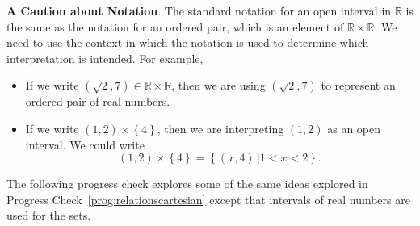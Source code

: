 \noindent
\note \textbf{A Caution about Notation}.  The standard notation for an open interval in  $\mathbb{R}$ is the same as the notation for an ordered pair, which is an element of  \mbox{$\mathbb{R} \times \mathbb{R}$}.  We need to use the context in which the notation is used to determine which interpretation is intended.  For example,

\begin{itemize}
\item If we write  $\left( {\sqrt 2 ,7} \right) \in \mathbb{R} \times \mathbb{R}$, then we are using  $\left( {\sqrt 2 ,7} \right)$ to represent an ordered pair of real numbers.

\item If we write  $\left( {1,2} \right) \times \left\{ 4 \right\}$, then we are interpreting  $\left( {1,2} \right)$ as an open interval.  We could write
\[
\left( {1,2} \right) \times \left\{ 4 \right\} = \left\{ {\left. {\left( {x,4} \right)\,} \right|1 < x < 2} \right\}\!.
\]
\end{itemize}
The following progress check explores some of the same ideas explored in Progress 
Check~\ref{prog:relationscartesian} except that intervals of real numbers are used for the sets.
\hbreak

